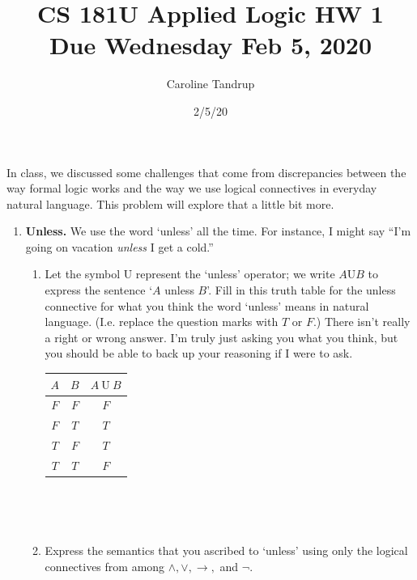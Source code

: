 \documentclass[12pt]{article}
\title{CS 181U Applied Logic HW 1 \\ Due Wednesday Feb 5, 2020}
\date{2/5/20}
\author{Caroline Tandrup}
\newenvironment{problem}[2][Problem]{\begin{trivlist}
\item[\hskip \labelsep {\bfseries #1}\hskip \labelsep {\bfseries #2.}]}{\end{trivlist}}
\begin{document}
\maketitle

 
\begin{problem}{1} In class, we discussed some challenges that come from discrepancies between the way formal logic works and the way we use logical connectives in everyday natural language. This problem will explore that a little bit more.  

\begin{enumerate}[label=\Alph*.]

\item \textbf{Unless.} We use the word `unless' all the time. For instance, I might say ``I'm going on vacation \textit{unless} I get a cold.''


\begin{enumerate}[label=\roman*.]

\item Let the symbol $\mathrm{U}$ represent the `unless' operator; we write $A \mathrm{U} B$ to express the sentence `$A$ unless $B$'. Fill in this truth table for the unless connective for what you think the word `unless' means in natural language. (I.e. replace the question marks with $T$ or $F$.) There isn't really a right or wrong answer. I'm truly just asking you what you think, but you should be able to back up your reasoning if I were to ask. \\

\begin{center}
\begin{tabular}{|c|c||c|}
\hline
$A$ & $B$ & $A \ \mathrm{U} \ B$ \\ \hline \hline
$F$ & $F$ & $F$ \\ \hline
$F$ & $T$ & $T$ \\ \hline
$T$ & $F$ & $T$ \\ \hline
$T$ & $T$ & $F$ \\ \hline
\end{tabular} \\ 
\end{center} 

~ \\

\item Express the semantics that you ascribed to `unless' using only the logical connectives from among $\land, \lor, \rightarrow, $ and $\neg$. \\


\end{enumerate}
\end{enumerate}
\end{problem}
\end{document}

